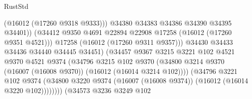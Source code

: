 \begin{lexlean}{RustStd}
\begin{coremodule}
                                              (@16012 (@17260 @9318 @9333)))
                                            @34380
                                            @34383
                                            @34386
                                            @34390
                                            @34395
                                            @34401))
                                        (@34412
                                          @9350
                                          @4691
                                          @22894
                                          @22908
                                          @17258
                                          (@16012 (@17260 @9351 @4521)))
                                        @17258
                                        (@16012 (@17260 @9311 @9357)))
                                      @34430
                                      @34433
                                      @34436
                                      @34440
                                      @34445
                                      @34451)
                                    (@34457
                                      @9367
                                      @3215
                                      @3221
                                      @102
                                      @4521
                                      @9370
                                      @4521
                                      @9374
                                      (@34796
                                        @3215
                                        @102
                                        @9370
                                        (@34800
                                          @3214
                                          @9370
                                          (@16007 (@16008 @9370))
                                          (@16012 (@16014 @3214 @102))))
                                      (@34796
                                        @3221
                                        @102
                                        @9374
                                        (@34800
                                          @3220
                                          @9374
                                          (@16007 (@16008 @9374))
                                          (@16012 (@16014 @3220 @102))))))))
                              (@34573
                                @3236
                                @3249
                                @102

\end{coremodule}
\end{lexlean}
